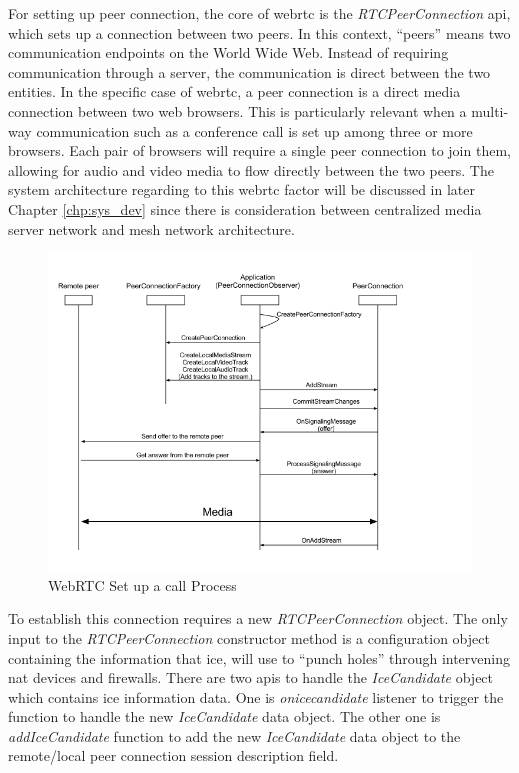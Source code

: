 \par For setting up peer connection, the core of \gls{webrtc} is the \textit{RTCPeerConnection} \gls{api}, which sets up a connection between two peers. In this context, “peers” means two communication endpoints on the World Wide Web. Instead of requiring communication through a server, the communication is direct between the two entities. In the specific case of \gls{webrtc}, a peer connection is a direct media connection between two web browsers. This is particularly relevant when a multi-way communication such as a conference call is set up among three or more browsers. Each pair of browsers will require a single peer connection to join them, allowing for audio and video media to flow directly between the two peers. The system architecture regarding to this \gls{webrtc} factor will be discussed in later Chapter \ref{chp:sys_dev} since there is consideration between centralized media server network and mesh network architecture.

\begin{figure}
	\centering
    	\includegraphics[width=0.60\textheight,natwidth=610,natheight=642]{figs/webrtc_diagram.png}
  	\caption{WebRTC Set up a call Process}
  	\label{fig:webrtc_diagram}
\end{figure}

\par To establish this connection requires a new \textit{RTCPeerConnection} object. The only input to the \textit{RTCPeerConnection} constructor method is a configuration object containing the information that \gls{ice}, will use to “punch holes” through intervening \gls{nat} devices and firewalls. There are two \gls{api}s to handle the  \textit{IceCandidate} object which contains \gls{ice} information data. One is \textit{onicecandidate} listener to trigger the function to handle the new \textit{IceCandidate} data object. The other one is \textit{addIceCandidate} function to add the new \textit{IceCandidate} data object to the remote/local peer connection session description field.

